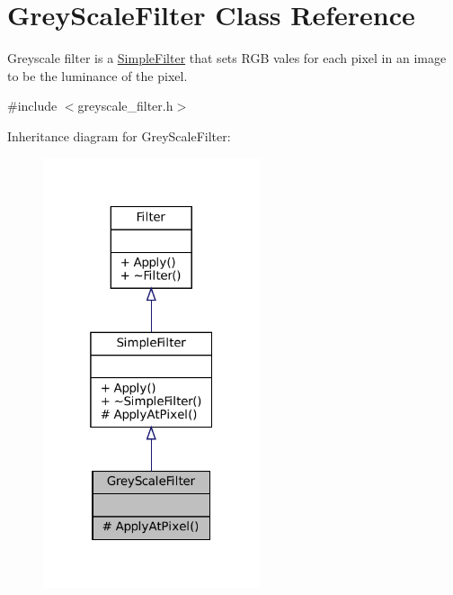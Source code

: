 \hypertarget{classGreyScaleFilter}{}\section{Grey\+Scale\+Filter Class Reference}
\label{classGreyScaleFilter}


Greyscale filter is a \hyperlink{classSimpleFilter}{Simple\+Filter} that sets R\+GB vales for each pixel in an image to be the luminance of the pixel.  




{\ttfamily \#include $<$greyscale\+\_\+filter.\+h$>$}



Inheritance diagram for Grey\+Scale\+Filter\+:\nopagebreak
\begin{figure}[H]
\begin{center}
\leavevmode
\includegraphics[width=181pt]{classGreyScaleFilter__inherit__graph}
\end{center}
\end{figure}



